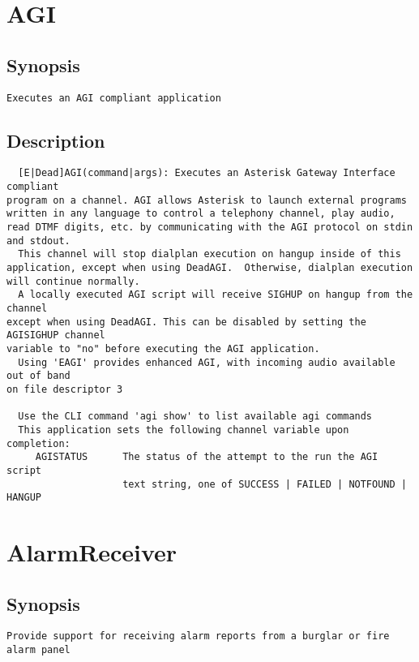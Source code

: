 \section{AGI}
\subsection{Synopsis}
\begin{verbatim}
Executes an AGI compliant application
\end{verbatim}
\subsection{Description}
\begin{verbatim}
  [E|Dead]AGI(command|args): Executes an Asterisk Gateway Interface compliant
program on a channel. AGI allows Asterisk to launch external programs
written in any language to control a telephony channel, play audio,
read DTMF digits, etc. by communicating with the AGI protocol on stdin
and stdout.
  This channel will stop dialplan execution on hangup inside of this
application, except when using DeadAGI.  Otherwise, dialplan execution
will continue normally.
  A locally executed AGI script will receive SIGHUP on hangup from the channel
except when using DeadAGI. This can be disabled by setting the AGISIGHUP channel
variable to "no" before executing the AGI application.
  Using 'EAGI' provides enhanced AGI, with incoming audio available out of band
on file descriptor 3

  Use the CLI command 'agi show' to list available agi commands
  This application sets the following channel variable upon completion:
     AGISTATUS      The status of the attempt to the run the AGI script
                    text string, one of SUCCESS | FAILED | NOTFOUND | HANGUP

\end{verbatim}


\section{AlarmReceiver}
\subsection{Synopsis}
\begin{verbatim}
Provide support for receiving alarm reports from a burglar or fire alarm panel
\end{verbatim}
